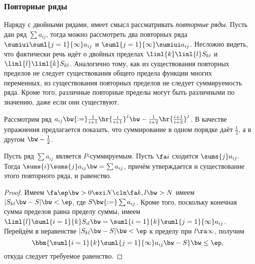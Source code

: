 \documentclass[a4paper]{article}
\begin{document}
\subsubsection{Повторные ряды}

Наряду с двойными рядами, имеет смысл рассматривать \emph{повторные ряды}. Пусть дан ряд $\sum
a_{ij}$, тогда можно рассмотреть два повторных ряда $\sumiui\suml{j=1}{\infty} a_{ij}$ и
$\suml{j=1}{\infty}\sumiui a_{ij}$. Несложно видеть, что фактически речь идёт о двойных пределах
$\liml{k}\liml{l} S_{kl}$ и $\liml{l}\liml{k} S_{kl}$. Аналогично тому, как из существования
повторных пределов не следует существования общего предела функции многих переменных, из
существования повторных пределов не следует суммируемость ряда. Кроме того, различные повторные
пределы могут быть различными по значению, даже если они существуют.

\begin{ex}
Рассмотрим ряд $a_{ij} \bw{:=} \frac{1}{i+1}\hr{\frac{i}{i+1}}^j \bw-
\frac{1}{i+2}\hr{\frac{i+1}{i+2}}^j$. В качестве упражнения предлагается показать, что суммирование
в одном порядке даёт $\frac12$, а в другом $\bw-\frac12$.
\end{ex}

\begin{theorem}
Пусть ряд $\sum a_{ij}$ является $P$-суммируемым. Пусть $\fa i$ сходится $\sums{j} a_{ij}$. Тогда
$\sums{i} \sums{j} a_{ij} \bw= \sum a_{ij}$, причём утверждается и существование этого повторного
ряда, и равенство.
\end{theorem}
\begin{proof}
Имеем $\fa \ep \bw> 0 \exi N\cln \fa k, l \bw> N$ имеем $|S_{kl} \bw- S| \bw<\ep$,
где $S \bw{:=} \sum a_{ij}$. Кроме того, поскольку конечная сумма пределов равна пределу
суммы, имеем $\liml{l} \suml{i=1}{k}S_{il} \bw= \suml{i=1}{k}\suml{j=1}{\infty} a_{ij}$.
Перейдём в неравенстве $|S_{kl} \bw- S| \bw< \ep$ к пределу при $l \ra \infty$, получим
$$\bbm{\suml{i=1}{k}\suml{j=1}{\infty} a_{ij} \bw- S} \bw\le \ep,$$ откуда следует требуемое равенство.
\end{proof}
\end{document}
